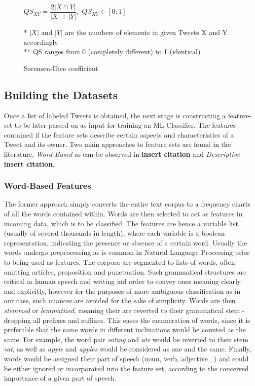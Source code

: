 		\begin{figure}[h]
			\begin{center}
				\label{fig:sorenson_dice}
				$QS_{XY} = \dfrac{2|X\cap Y|}{|X|+|Y|},$ \hspace{10pt}  $QS_{XY} \in [0:1]$
				\par
			\end{center}
			{\small
				* $|X|$ and $|Y|$ are the numbers of elements in given Tweets X and Y accordingly 
				\\
				** QS ranges from 0 (completely different) to 1 (identical)
				\caption{S\o rensen-Dice coefficient}
			}
		\end{figure}
		
		\newpage
		
	\subsection{Building the Datasets}
	\label{build_features}
	Once a list of labeled Tweets is obtained, the next stage is constructing a feature-set to be later passed on as input for training an ML Classifier. The features contained if the feature sets describe certain aspects and characteristics of a Tweet and its owner. Two main approaches to feature sets are found in the literature, \textit{Word-Based} as can be observed in \textbf{\color{red} insert citation} and \textit{Descriptive} \textbf{\color{red} insert citation}. 
	
		\subsubsection{Word-Based Features}
		The former approach simply converts the entire text corpus to a frequency charts of all the words contained within. Words are then selected to act as features in incoming data, which is to be classified. The features are hence a variable list (usually of several thousands in length), where each variable is a boolean representation, indicating the presence or absence of a certain word. Usually the words undergo preprocessing as is common in Natural Language Processing prior to being used as features. The corpora are segmented to lists of words, often omitting articles, proposition and punctuation. Such grammatical structures are critical in human speech and writing ind order to convey ones meaning clearly and explicitly, however for the purposes of more ambiguous classification as in our case, such nuances are avoided for the sake of simplicity. Words are then \textit{stemmed} or \textit{lemmatized}, meaning their are reverted to their grammatical stem - dropping all prefixes and suffixes. This eases the enumeration of words, since it is preferable that the same words in different inclinations would be counted as the same. For example, the word pair \textit{eating} and \textit{ate} would be reverted to their stem \textit{eat}, as well as \textit{apple} and \textit{apples} would be considered as one and the same. Finally, words would be assigned their part of speech (noun, verb, adjective ..) and could be either ignored or incorporated into the feature set, according to the conceived importance of a given part of speech.
		
